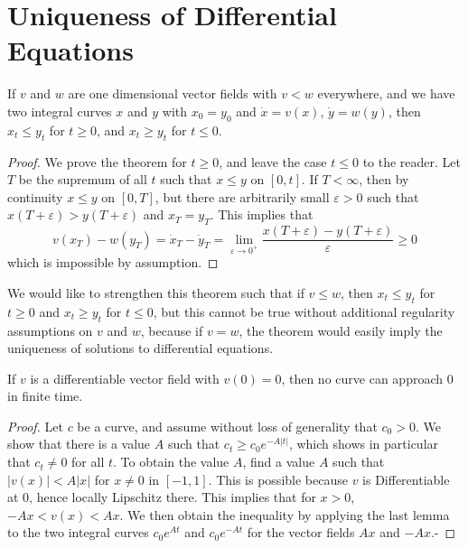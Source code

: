 \section{Uniqueness of Differential Equations}

\begin{lemma}
    If $v$ and $w$ are one dimensional vector fields with $v < w$ everywhere, and we have two integral curves $x$ and $y$ with $x_0 = y_0$ and $\dot{x} = v(x)$, $\dot{y} = w(y)$, then $x_t \leq y_t$ for $t \geq 0$, and $x_t \geq y_t$ for $t \leq 0$.
\end{lemma}
\begin{proof}
    We prove the theorem for $t \geq 0$, and leave the case $t \leq 0$ to the reader. Let $T$ be the supremum of all $t$ such that $x \leq y$ on $[0,t]$. If $T < \infty$, then by continuity $x \leq y$ on $[0,T]$, but there are arbitrarily small $\varepsilon > 0$ such that $x(T+\varepsilon) > y(T+\varepsilon)$ and $x_T = y_T$. This implies that
    \[ v(x_T) - w(y_T) = \dot{x}_T - \dot{y}_T = \lim_{\varepsilon \to 0^+} \frac{x(T+\varepsilon) - y(T+\varepsilon)}{\varepsilon} \geq 0 \]
    which is impossible by assumption.
\end{proof}

We would like to strengthen this theorem such that if $v \leq w$, then $x_t \leq y_t$ for $t \geq 0$ and $x_t \geq y_t$ for $t \leq 0$, but this cannot be true without additional regularity assumptions on $v$ and $w$, because if $v = w$, the theorem would easily imply the uniqueness of solutions to differential equations.

\begin{theorem}
    If $v$ is a differentiable vector field with $v(0) = 0$, then no curve can approach $0$ in finite time.
\end{theorem}
\begin{proof}
    Let $c$ be a curve, and assume without loss of generality that $c_0 > 0$. We show that there is a value $A$ such that $c_t \geq c_0e^{-A|t|}$, which shows in particular that $c_t \neq 0$ for all $t$. To obtain the value $A$, find a value $A$ such that $|v(x)| < A|x|$ for $x \neq 0$ in $[-1,1]$. This is possible because $v$ is Differentiable at $0$, hence locally Lipschitz there. This implies that for $x > 0$, $-Ax < v(x) < Ax$. We then obtain the inequality by applying the last lemma to the two integral curves $c_0e^{At}$ and $c_0e^{-At}$ for the vector fields $Ax$ and $-Ax$.-
\end{proof}

